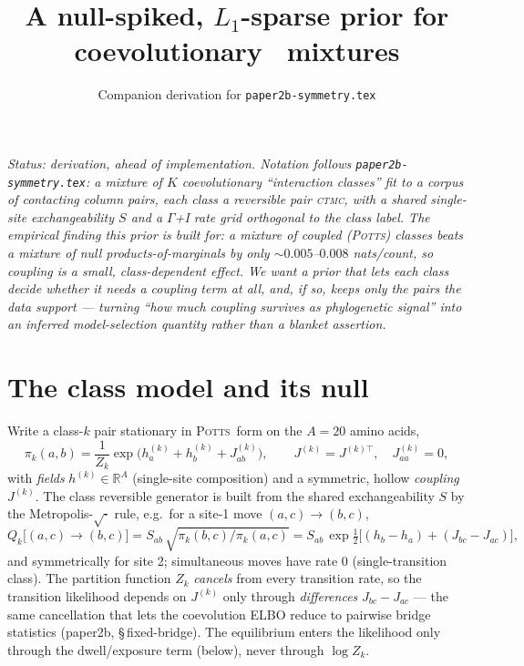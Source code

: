 \documentclass[11pt]{article}
\title{A null-spiked, $L_1$-sparse prior for coevolutionary \Potts\ mixtures}
\author{Companion derivation for \texttt{paper2b-symmetry.tex}}
\date{}
\newcommand{\Potts}{\textsc{Potts}}
\newcommand{\CTMC}{\textsc{ctmc}}
\begin{document}
\maketitle

\noindent\emph{Status: derivation, ahead of implementation. Notation follows
\texttt{paper2b-symmetry.tex}: a mixture of $K$ coevolutionary ``interaction classes''
fit to a corpus of contacting column pairs, each class a reversible pair \CTMC, with a
shared single-site exchangeability $S$ and a $\Gamma$+I rate grid orthogonal to the class
label. The empirical finding this prior is built for: a mixture of coupled
(\Potts) classes beats a mixture of null products-of-marginals by only $\sim$$0.005$--$0.008$
nats/count, so coupling is a small, class-dependent effect. We want a prior that lets each
class decide whether it needs a coupling term at all, and, if so, keeps only the pairs the
data support --- turning ``how much coupling survives as phylogenetic signal'' into an
inferred model-selection quantity rather than a blanket assertion.}

\section{The class model and its null}
\label{sec:model}

Write a class-$k$ pair stationary in \Potts\ form on the $A{=}20$ amino acids,
\begin{equation}
\label{eq:stationary}
\pi_k(a,b)=\frac{1}{Z_k}\exp\!\big(h^{(k)}_a+h^{(k)}_b+J^{(k)}_{ab}\big),\qquad
J^{(k)}=J^{(k)\top},\quad J^{(k)}_{aa}=0,
\end{equation}
with \emph{fields} $h^{(k)}\in\mathbb R^{A}$ (single-site composition) and a symmetric,
hollow \emph{coupling} $J^{(k)}$. The class reversible generator is built from the shared
exchangeability $S$ by the Metropolis-$\sqrt{\cdot}$ rule, e.g.\ for a site-1 move
$(a,c)\!\to\!(b,c)$,
\begin{equation}
\label{eq:generator}
Q_k\big[(a,c)\!\to\!(b,c)\big]=S_{ab}\,\sqrt{\pi_k(b,c)/\pi_k(a,c)}
   =S_{ab}\,\exp\!\tfrac12\!\big[(h_b-h_a)+(J_{bc}-J_{ac})\big],
\end{equation}
and symmetrically for site 2; simultaneous moves have rate $0$ (single-transition class).
The partition function $Z_k$ \emph{cancels} from every transition rate, so the
transition likelihood depends on $J^{(k)}$ only through \emph{differences}
$J_{bc}-J_{ac}$ --- the same cancellation that lets the coevolution ELBO reduce to pairwise
bridge statistics (paper2b, \S\,fixed-bridge). The equilibrium enters the likelihood only
through the dwell/exposure term (below), never through $\log Z_k$.
\end{document}

